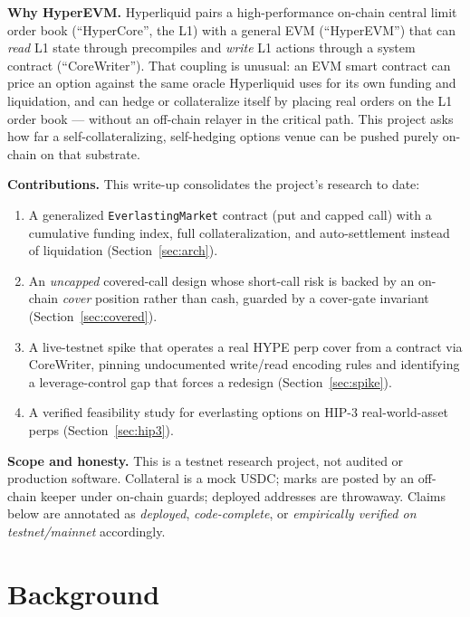 \documentclass[11pt]{article}
\newcommand{\code}[1]{\texttt{\small #1}}
\begin{document}
\textbf{Why HyperEVM.} Hyperliquid pairs a high-performance on-chain central limit order book
(``HyperCore'', the L1) with a general EVM (``HyperEVM'') that can \emph{read} L1 state through
precompiles and \emph{write} L1 actions through a system contract (``CoreWriter''). That coupling is
unusual: an EVM smart contract can price an option against the same oracle Hyperliquid uses for its
own funding and liquidation, and can hedge or collateralize itself by placing real orders on the L1
order book --- without an off-chain relayer in the critical path. This project asks how far a
self-collateralizing, self-hedging options venue can be pushed purely on-chain on that substrate.

\textbf{Contributions.} This write-up consolidates the project's research to date:
\begin{enumerate}[leftmargin=1.4em,itemsep=2pt]
  \item A generalized \code{EverlastingMarket} contract (put and capped call) with a cumulative
        funding index, full collateralization, and auto-settlement instead of liquidation
        (Section~\ref{sec:arch}).
  \item An \emph{uncapped} covered-call design whose short-call risk is backed by an on-chain
        \emph{cover} position rather than cash, guarded by a cover-gate invariant
        (Section~\ref{sec:covered}).
  \item A live-testnet spike that operates a real HYPE perp cover from a contract via CoreWriter,
        pinning undocumented write/read encoding rules and identifying a leverage-control gap that
        forces a redesign (Section~\ref{sec:spike}).
  \item A verified feasibility study for everlasting options on HIP-3 real-world-asset perps
        (Section~\ref{sec:hip3}).
\end{enumerate}

\textbf{Scope and honesty.} This is a testnet research project, not audited or production software.
Collateral is a mock USDC; marks are posted by an off-chain keeper under on-chain guards; deployed
addresses are throwaway. Claims below are annotated as \emph{deployed}, \emph{code-complete}, or
\emph{empirically verified on testnet/mainnet} accordingly.

\section{Background}
\end{document}
